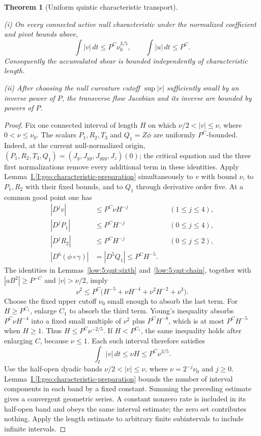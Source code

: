 \documentclass[11pt]{amsart}
\newtheorem{theorem}{Theorem}[section]
\theoremstyle{definition}
\theoremstyle{remark}
\numberwithin{equation}{section}
\newcommand{\partIref}[1]{\hyperref[I:#1]{I.\ref*{I:#1}}}
\begin{document}
\begin{theorem}[Uniform quintic characteristic transport]\label{low:5:qnt:transport}

\noindent\textup{(i)} On every connected active null characteristic under the normalized coefficient and pivot bounds above,
\[
\int |v|\,dt\le P^C\nu_0^{3/5},\qquad \int |u|\,dt\le P^C.
\]
Consequently the accumulated shear is bounded independently of characteristic length.

\noindent\textup{(ii)} After choosing the null curvature cutoff $\sup|r|$ sufficiently small by an inverse power of $P$, the transverse flow Jacobian and its inverse are bounded by powers of $P$.
\end{theorem}
\begin{proof}
Fix one connected interval of length $H$ on which $\nu/2<|v|\le\nu$, where $0<\nu\le\nu_0$. The scalars $P_1,R_2,T_3$ and $Q_1=Z\phi$ are uniformly $P^C$-bounded. Indeed, at the current null-normalized origin, $(P_1,R_2,T_3,Q_1)=(J_y,J_{yy},J_{yyy},J_z)(0)$; the critical equation and the three first normalizations remove every additional term in these identities. Apply Lemma~\partIref{geo:characteristic-preparation} simultaneously to $v$ with bound $\nu$, to $P_1,R_2$ with their fixed bounds, and to $Q_1$ through derivative order five. At a common good point one has
\[
\begin{aligned}
|D^jv|&\le P^C\nu H^{-j} &&(1\le j\le4),\\
|D^jP_1|&\le P^CH^{-j} &&(0\le j\le4),\\
|D^jR_2|&\le P^CH^{-j} &&(0\le j\le2),\\
|D^6(\phi\circ\gamma)|&=|D^5Q_1|\le P^CH^{-5}.&
\end{aligned}
\]
The identities in Lemmas~\ref{low:5:qnt:sixth} and~\ref{low:5:qnt:chain}, together with $|aB^2|\ge P^{-C}$ and $|v|>\nu/2$, imply
\[
\nu^2\le P^C\bigl(H^{-5}+\nu H^{-4}+\nu^2H^{-2}+\nu^3\bigr).
\]
Choose the fixed upper cutoff $\nu_0$ small enough to absorb the last term. For $H\ge P^{C_1}$, enlarge $C_1$ to absorb the third term. Young's inequality absorbs $P^C\nu H^{-4}$ into a fixed small multiple of $\nu^2$ plus $P^CH^{-8}$, which is at most $P^CH^{-5}$ when $H\ge1$. Thus $H\le P^C\nu^{-2/5}$. If $H<P^{C_1}$, the same inequality holds after enlarging $C$, because $\nu\le1$. Each such interval therefore satisfies
\[
\int_I|v|\,dt\le\nu H\le P^C\nu^{3/5}.
\]
Use the half-open dyadic bands $\nu/2<|v|\le\nu$, where $\nu=2^{-j}\nu_0$ and $j\ge0$. Lemma~\partIref{geo:characteristic-preparation} bounds the number of interval components in each band by a fixed constant. Summing the preceding estimate gives a convergent geometric series. A constant nonzero rate is included in its half-open band and obeys the same interval estimate; the zero set contributes nothing. Apply the length estimate to arbitrary finite subintervals to include infinite intervals.


\end{proof}
\end{document}
